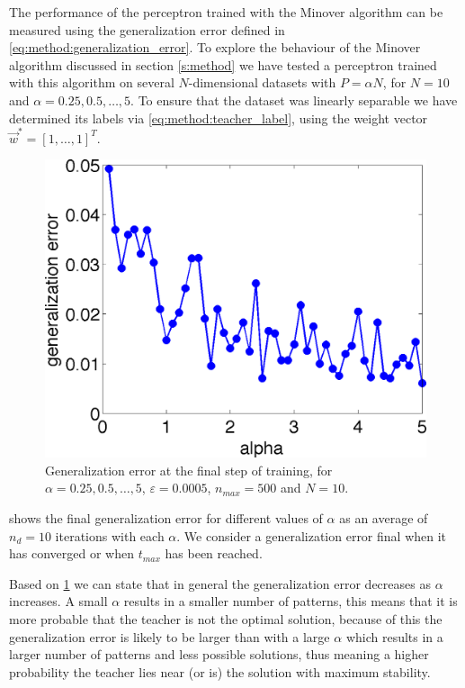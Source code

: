 The performance of the perceptron trained with the Minover algorithm can be measured using the generalization error defined in \autoref{eq:method:generalization_error}. To explore the behaviour of the Minover algorithm discussed in section \ref{s:method} we have tested a perceptron trained with this algorithm on several $N$-dimensional datasets with $P = \alpha N$, for $N = 10$ and $\alpha = 0.25, 0.5, \dotsc, 5$. To ensure that the dataset was linearly separable we have determined its labels via \eqref{eq:method:teacher_label}, using the weight vector $\vec{w}^* = [1, \dotsc, 1]^T$.\\

\begin{figure}[b]
	\centering
	\includegraphics[width=0.9\columnwidth]{./img/finalgeneralizationerrors}
	\caption{Generalization error at the final step of training, for $\alpha = 0.25, 0.5, \dotsc, 5$, $\varepsilon = 0.0005$, $n_{max} = 500$ and $N = 10$.}
	\label{fig:exp:finalgeneralizationError}
\end{figure}

 shows the final generalization error for different values of $\alpha$ as an average of $n_d = 10$ iterations with each $\alpha$. We consider a generalization error final when it has converged or when $t_{max}$ has been reached. 

Based on \cref{fig:exp:finalgeneralizationError} we can state that in general the generalization error decreases as $\alpha$ increases. A small $\alpha$ results in a smaller number of patterns, this means that it is more probable that the teacher is not the optimal solution, because of this the generalization error is likely to be larger than with a large $\alpha$ which results in a larger number of patterns and less possible solutions, thus meaning a higher probability the teacher lies near (or is) the solution with maximum stability.

